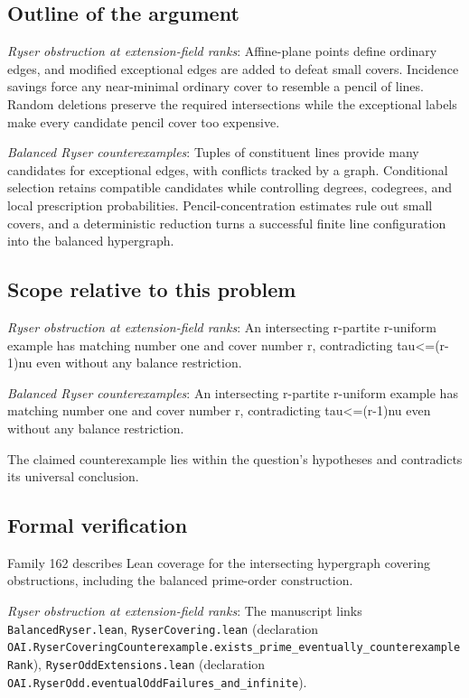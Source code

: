 \documentclass[11pt]{article}
\begin{document}
\subsection{Outline of the argument}
\textit{Ryser obstruction at extension-field ranks}: Affine-plane points define ordinary edges, and modified exceptional edges are added to defeat small covers. Incidence savings force any near-minimal ordinary cover to resemble a pencil of lines. Random deletions preserve the required intersections while the exceptional labels make every candidate pencil cover too expensive.

\textit{Balanced Ryser counterexamples}: Tuples of constituent lines provide many candidates for exceptional edges, with conflicts tracked by a graph. Conditional selection retains compatible candidates while controlling degrees, codegrees, and local prescription probabilities. Pencil-concentration estimates rule out small covers, and a deterministic reduction turns a successful finite line configuration into the balanced hypergraph.

\subsection{Scope relative to this problem}
\textit{Ryser obstruction at extension-field ranks}: An intersecting r-partite r-uniform example has matching number one and cover number r, contradicting tau<=(r-1)nu even without any balance restriction.

\textit{Balanced Ryser counterexamples}: An intersecting r-partite r-uniform example has matching number one and cover number r, contradicting tau<=(r-1)nu even without any balance restriction.

The claimed counterexample lies within the question’s hypotheses and contradicts its universal conclusion.

\subsection{Formal verification}
Family 162 describes Lean coverage for the intersecting hypergraph covering obstructions, including the balanced prime-order construction.

\textit{Ryser obstruction at extension-field ranks}: The manuscript links \texttt{BalancedRyser.lean}, \texttt{RyserCovering.lean} (declaration \texttt{OAI.RyserCoveringCounterexample.exists\_prime\_eventually\_counterexampleRank}), \texttt{RyserOddExtensions.lean} (declaration \texttt{OAI.RyserOdd.eventualOddFailures\_and\_infinite}).
\end{document}
